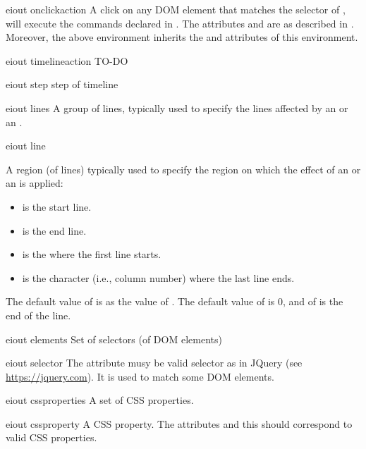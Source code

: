 \bigskip
\xmlstruct
{eiout}
{onclickaction}
{%
%
  A click on any DOM element that matches the selector of
  , will execute the commands declared in
  .
%
  The attributes  and  are
  as described in . Moreover, the above
   environment inherits the
   and  attributes of this
  environment.
%
}


\bigskip
\xmlstruct
{eiout}
{timelineaction}
{%
%
  TO-DO
%
}

\bigskip
\xmlstruct
{eiout}
{step}
{%
step of timeline
}


\bigskip
\xmlstruct
{eiout}
{lines}
{
A group of lines, typically used to specify the lines affected by 
an  or an .
}


\bigskip
\xmlstruct
{eiout}
{line}
{%
%
  A region (of lines) typically used to specify the region on which
  the effect of an  or an
   is applied:
%
\begin{itemize}
\item {} is the start line.
\item {} is the end line.
\item {} is the  where the first line starts.
\item {} is the character (i.e., column number) where the last line ends.
\end{itemize}
%
The default value of  is as the value of
. The default value of  is
0, and of  is the end of the line.
%
}

\bigskip
\xmlstruct
{eiout}
{elements}
{%
  Set of selectors (of DOM elements)
} 

\bigskip
\xmlstruct
{eiout}
{selector}
{%
%
  The attribute  musy be valid selector as in
  JQuery (see \url{https://jquery.com}). It is used to match some DOM
  elements.
%
}


\bigskip
\xmlstruct
{eiout}
{cssproperties}
{%
%
A set of CSS properties.
%
}


\bigskip
\xmlstruct
{eiout}
{cssproperty}
{%
%
  A CSS property. The attributes  and this
   should correspond to valid CSS properties.
%
}


